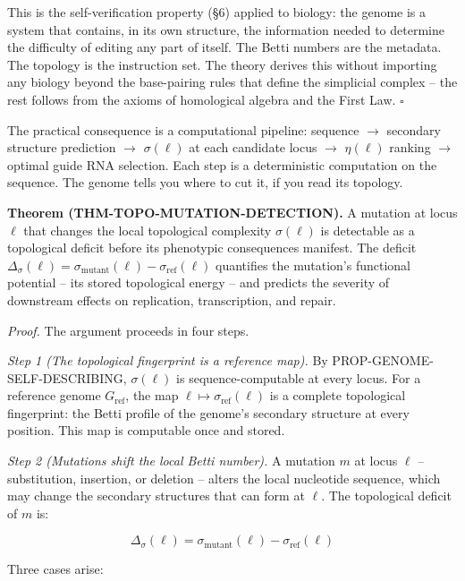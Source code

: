 \documentclass[
  11pt,
]{article}
\begin{document}
This is the self-verification property (§6) applied to biology: the
genome is a system that contains, in its own structure, the information
needed to determine the difficulty of editing any part of itself. The
Betti numbers are the metadata. The topology is the instruction set. The
theory derives this without importing any biology beyond the
base-pairing rules that define the simplicial complex -- the rest
follows from the axioms of homological algebra and the First Law.
\(\square\)

The practical consequence is a computational pipeline: sequence \(\to\)
secondary structure prediction \(\to\) \(\sigma(\ell)\) at each
candidate locus \(\to\) \(\eta(\ell)\) ranking \(\to\) optimal guide RNA
selection. Each step is a deterministic computation on the sequence. The
genome tells you where to cut it, if you read its topology.

\textbf{Theorem (THM-TOPO-MUTATION-DETECTION).} A mutation at locus
\(\ell\) that changes the local topological complexity \(\sigma(\ell)\)
is detectable as a topological deficit before its phenotypic
consequences manifest. The deficit
\(\Delta_\sigma(\ell) = \sigma_{\text{mutant}}(\ell) - \sigma_{\text{ref}}(\ell)\)
quantifies the mutation's functional potential -- its stored topological
energy -- and predicts the severity of downstream effects on
replication, transcription, and repair.

\emph{Proof.} The argument proceeds in four steps.

\emph{Step 1 (The topological fingerprint is a reference map).} By
PROP-GENOME-SELF-DESCRIBING, \(\sigma(\ell)\) is sequence-computable at
every locus. For a reference genome \(G_{\text{ref}}\), the map
\(\ell \mapsto \sigma_{\text{ref}}(\ell)\) is a complete topological
fingerprint: the Betti profile of the genome's secondary structure at
every position. This map is computable once and stored.

\emph{Step 2 (Mutations shift the local Betti number).} A mutation \(m\)
at locus \(\ell\) -- substitution, insertion, or deletion -- alters the
local nucleotide sequence, which may change the secondary structures
that can form at \(\ell\). The topological deficit of \(m\) is:

\[\Delta_\sigma(\ell) = \sigma_{\text{mutant}}(\ell) - \sigma_{\text{ref}}(\ell)\]

Three cases arise:
\end{document}

